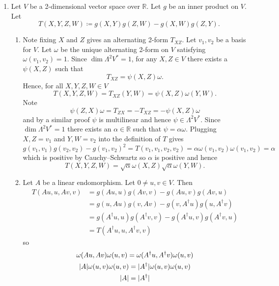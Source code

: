 \documentclass[a4paper, 12pt]{article}
\newcommand{\R}{\mathbb{R}}
\DeclarePairedDelimiter\abs{\lvert}{\rvert}
\begin{document}
\begin{enumerate}
\begin{enumerate}
\end{enumerate}

\item Let \(V\) be a 2-dimensional vector space over \(\R\). Let \(g\) be an inner product on \(V\). Let
\[T(X,Y,Z,W)\coloneqq g(X,Y)g(Z,W)-g(X,W)g(Z,Y).\]
\begin{enumerate}

\item Note fixing \(X\) and \(Z\) gives an alternating 2-form \(T_{XZ}\). Let \(v_1,v_2\) be a basis for \(V\). Let \(\omega\) be the unique alternating 2-form on \(V\) satisfying \(\omega(v_1,v_2)=1\). Since \(\dim\Lambda^2V^*=1\), for any \(X,Z\in V\) there exists a \(\psi(X,Z)\) such that
\[T_{XZ}=\psi(X,Z)\omega.\]
Hence, for all \(X,Y,Z,W\in V\)
\[T(X,Y,Z,W)=T_{XZ}(Y,W)=\psi(X,Z)\omega(Y,W).\]
Note
\[\psi(Z,X)\omega=T_{ZX}=-T_{XZ}=-\psi(X,Z)\omega\]
and by a similar proof \(\psi\) is multilinear and hence \(\psi\in\Lambda^2V^*\). Since \(\dim\Lambda^2V^*=1\) there exists an \(\alpha\in\R\) such that \(\psi=\alpha\omega\). Plugging \(X,Z=v_1\) and \(Y,W=v_2\) into the definition of \(T\) gives
\[g(v_1,v_1)g(v_2,v_2)-g(v_1,v_2)^2=T(v_1,v_1,v_2,v_2)=\alpha\omega(v_1,v_2)\omega(v_1,v_2)=\alpha\]
which is positive by Cauchy--Schwartz so \(\alpha\) is positive and hence
\[T(X,Y,Z,W)=\sqrt{\alpha}\omega(X,Z)\sqrt{\alpha}\omega(Y,W).\]

\item Let \(A\) be a linear endomorphism. Let \(0\neq u,v\in V\). Then
\begin{align*}
T(Au,u,Av,v)&=g(Au,u)g(Av,v)-g(Au,v)g(Av,u)\\
&=g(u,Au)g(v,Av)-g(v,A^\dag u)g(u,A^\dag v)\\
&=g(A^\dag u,u)g(A^\dag v,v)-g(A^\dag u,v)g(A^\dag v,u)\\
&=T(A^\dag u,u,A^\dag v,v)
\end{align*}
so
\begin{gather*}
\omega(Au,Av)\omega(u,v)=\omega(A^\dag u,A^\dag v)\omega(u,v)\\
\abs{A}\omega(u,v)\omega(u,v)=\abs{A^\dag}\omega(u,v)\omega(u,v)\\
\abs{A}=\abs{A^\dag}
\end{gather*}


\end{enumerate}
\end{enumerate}
\end{document}
